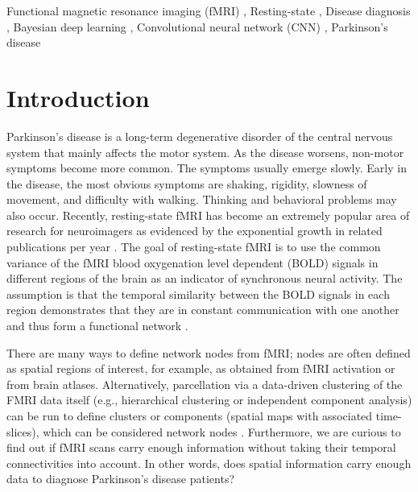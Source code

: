 \documentclass[a4paper,fleqn]{cas-dc}
\begin{document}

\begin{keywords}
Functional magnetic resonance imaging (fMRI) \sep
Resting-state \sep
Disease diagnosis \sep
Bayesian deep learning \sep
Convolutional neural network (CNN) \sep
Parkinson's disease
\end{keywords}


\maketitle

\section{Introduction}

Parkinson's disease is a long-term degenerative disorder of the central nervous system that mainly affects the motor system. As the disease worsens, non-motor symptoms become more common. The symptoms usually emerge slowly. Early in the disease, the most obvious symptoms are shaking, rigidity, slowness of movement, and difficulty with walking. Thinking and behavioral problems may also occur. Recently, resting-state fMRI has become an extremely popular area of research for neuroimagers as evidenced by the exponential growth in related publications per year \cite{Murphy2013}. The goal of resting-state fMRI is to use the common variance of the fMRI blood oxygenation level dependent (BOLD) signals in different regions of the brain as an indicator of synchronous neural activity. The assumption is that the temporal similarity between the BOLD signals in each region demonstrates that they are in constant communication with one another and thus form a functional network \cite{Calhoun2016}.

There are many ways to define network nodes from fMRI; nodes are often defined as spatial regions of interest, for example, as obtained from fMRI activation or from brain atlases. Alternatively, parcellation via a data-driven clustering of the FMRI data itself (e.g., hierarchical clustering or independent component analysis) can be run to define clusters or components (spatial maps with associated time-slices), which can be considered network nodes \cite{Smith2012}. Furthermore, we are curious to find out if fMRI scans carry enough information without taking their temporal connectivities into account. In other words, does spatial information carry enough data to diagnose Parkinson's disease patients?
\end{document}
